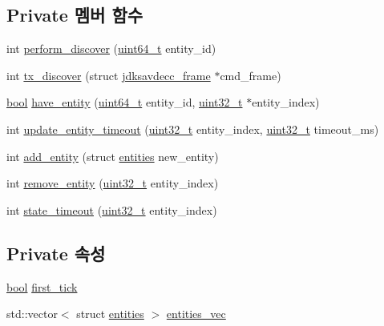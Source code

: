 \subsection*{Private 멤버 함수}
\begin{DoxyCompactItemize}
\item 
int \hyperlink{classavdecc__lib_1_1adp__discovery__state__machine_a0fbed7e0321c500ceeccf33843274965}{perform\+\_\+discover} (\hyperlink{parse_8c_aec6fcb673ff035718c238c8c9d544c47}{uint64\+\_\+t} entity\+\_\+id)
\item 
int \hyperlink{classavdecc__lib_1_1adp__discovery__state__machine_afaadacc9caf0e6254a11fc743f5b635b}{tx\+\_\+discover} (struct \hyperlink{structjdksavdecc__frame}{jdksavdecc\+\_\+frame} $\ast$cmd\+\_\+frame)
\item 
\hyperlink{avb__gptp_8h_af6a258d8f3ee5206d682d799316314b1}{bool} \hyperlink{classavdecc__lib_1_1adp__discovery__state__machine_a6c007eda13cfcbde481d090a7f7d61d2}{have\+\_\+entity} (\hyperlink{parse_8c_aec6fcb673ff035718c238c8c9d544c47}{uint64\+\_\+t} entity\+\_\+id, \hyperlink{parse_8c_a6eb1e68cc391dd753bc8ce896dbb8315}{uint32\+\_\+t} $\ast$entity\+\_\+index)
\item 
int \hyperlink{classavdecc__lib_1_1adp__discovery__state__machine_a4a6c26ae852a2853703a9acf369b96bd}{update\+\_\+entity\+\_\+timeout} (\hyperlink{parse_8c_a6eb1e68cc391dd753bc8ce896dbb8315}{uint32\+\_\+t} entity\+\_\+index, \hyperlink{parse_8c_a6eb1e68cc391dd753bc8ce896dbb8315}{uint32\+\_\+t} timeout\+\_\+ms)
\item 
int \hyperlink{classavdecc__lib_1_1adp__discovery__state__machine_aaa476a159da4bd3ba5c5a118b9179635}{add\+\_\+entity} (struct \hyperlink{structavdecc__lib_1_1adp__discovery__state__machine_1_1entities}{entities} new\+\_\+entity)
\item 
int \hyperlink{classavdecc__lib_1_1adp__discovery__state__machine_a745c9a529baab826aedf35058c13876e}{remove\+\_\+entity} (\hyperlink{parse_8c_a6eb1e68cc391dd753bc8ce896dbb8315}{uint32\+\_\+t} entity\+\_\+index)
\item 
int \hyperlink{classavdecc__lib_1_1adp__discovery__state__machine_af860f46c116b2a474e2dea750ee07005}{state\+\_\+timeout} (\hyperlink{parse_8c_a6eb1e68cc391dd753bc8ce896dbb8315}{uint32\+\_\+t} entity\+\_\+index)
\end{DoxyCompactItemize}
\subsection*{Private 속성}
\begin{DoxyCompactItemize}
\item 
\hyperlink{avb__gptp_8h_af6a258d8f3ee5206d682d799316314b1}{bool} \hyperlink{classavdecc__lib_1_1adp__discovery__state__machine_add99975cd88f74770a569395b2633589}{first\+\_\+tick}
\item 
std\+::vector$<$ struct \hyperlink{structavdecc__lib_1_1adp__discovery__state__machine_1_1entities}{entities} $>$ \hyperlink{classavdecc__lib_1_1adp__discovery__state__machine_a1a3e2aa0e465f64d8e1e03f7a11556e5}{entities\+\_\+vec}
\end{DoxyCompactItemize}


